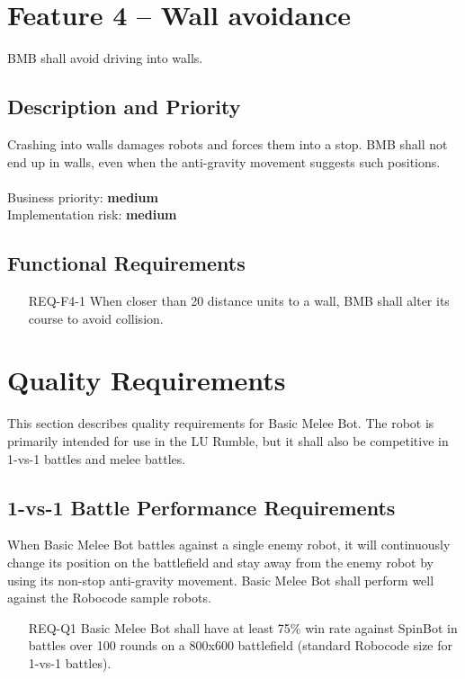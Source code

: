 \documentclass{scrreprt}
\begin{document}
\section{Feature 4 -- Wall avoidance}
BMB shall avoid driving into walls.

\subsection{Description and Priority}
Crashing into walls damages robots and forces them into a stop. BMB shall not end up in walls, even when the anti-gravity movement suggests such positions.\\\\Business priority: \textbf{medium}\\
Implementation risk: \textbf{medium}

\subsection{Functional Requirements}
\begin{itemize}
\item[REQ-F4-1] When closer than 20 distance units to a wall, BMB shall alter its course to avoid collision.
\end{itemize}

\section{Quality Requirements}
This section describes quality requirements for Basic Melee Bot. The robot is primarily intended for use in the LU Rumble, but it shall also be competitive in 1-vs-1 battles and melee battles.

\subsection{1-vs-1 Battle Performance Requirements}
When Basic Melee Bot battles against a single enemy robot, it will continuously change its position on the battlefield and stay away from the enemy robot by using its non-stop anti-gravity movement. Basic Melee Bot shall perform well against the Robocode sample robots.

\begin{itemize}
\item[REQ-Q1] Basic Melee Bot shall have at least 75\% win rate against SpinBot in battles over 100 rounds on a 800x600 battlefield (standard Robocode size for 1-vs-1 battles).
\end{itemize}
\end{document}
